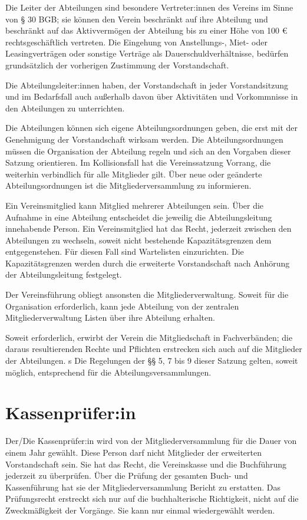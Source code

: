 \documentclass[10pt,a4paper]{article}
\begin{document}
Die Leiter der Abteilungen sind besondere Vertreter:innen des Vereins im Sinne von § 30 BGB; sie können den
Verein beschränkt auf ihre Abteilung und beschränkt auf das Aktivvermögen der Abteilung bis zu einer Höhe
von 100 € rechtsgeschäftlich vertreten. Die Eingehung von Anstellungs-, Miet- oder Leasingverträgen oder
sonstige Verträge als Dauerschuldverhältnisse, bedürfen grundsätzlich der vorherigen Zustimmung der
Vorstandschaft.

Die Abteilungsleiter:innen haben, der Vorstandschaft in jeder Vorstandsitzung und im Bedarfsfall auch
außerhalb davon über Aktivitäten und Vorkommnisse in den Abteilungen zu unterrichten.

Die Abteilungen können sich eigene Abteilungsordnungen geben, die erst mit der Genehmigung der
Vorstandschaft wirksam werden. Die Abteilungsordnungen müssen die Organisation der Abteilung regeln und 
sich an den Vorgaben dieser Satzung orientieren.
Im Kollisionsfall hat die Vereinssatzung Vorrang, die weiterhin verbindlich für alle Mitglieder gilt. Über neue
oder geänderte Abteilungsordnungen ist die Mitgliederversammlung zu informieren.

Ein Vereinsmitglied kann Mitglied mehrerer Abteilungen sein. Über die Aufnahme in eine Abteilung entscheidet
die jeweilig die Abteilungsleitung innehabende Person. Ein Vereinsmitglied hat das Recht, jederzeit zwischen
den Abteilungen zu wechseln, soweit nicht bestehende Kapazitätsgrenzen dem entgegenstehen. Für diesen Fall
sind Wartelisten einzurichten. Die Kapazitätsgrenzen werden durch die erweiterte Vorstandschaft nach
Anhörung der Abteilungsleitung festgelegt.

Der Vereinsführung obliegt ansonsten die Mitgliederverwaltung. Soweit für die Organisation erforderlich, kann
jede Abteilung von der zentralen Mitgliederverwaltung Listen über ihre Abteilung erhalten.

Soweit erforderlich, erwirbt der Verein die Mitgliedschaft in Fachverbänden; die daraus resultierenden Rechte
und Pflichten erstrecken sich auch auf die Mitglieder der Abteilungen.
s
Die Regelungen der §§ 5, 7 bis 9 dieser Satzung gelten, soweit möglich, entsprechend für die
Abteilungsversammlungen.
\section{Kassenprüfer:in}
Der/Die Kassenprüfer:in wird von der Mitgliederversammlung für die Dauer von einem Jahr gewählt. Diese
Person darf nicht Mitglieder der erweiterten Vorstandschaft sein. Sie hat das Recht, die Vereinskasse und die
Buchführung jederzeit zu überprüfen. Über die Prüfung der gesamten Buch- und Kassenführung hat sie der
Mitgliederversammlung Bericht zu erstatten. Das Prüfungsrecht erstreckt sich nur auf die buchhalterische
Richtigkeit, nicht auf die Zweckmäßigkeit der Vorgänge. Sie kann nur einmal wiedergewählt werden.
\end{document}
